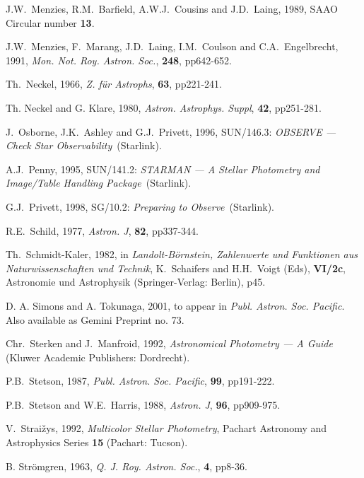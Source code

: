 \documentclass[twoside,11pt]{article}
\newcommand{\htmladdnormallink}[2]{#1}
\newcommand{\xref}[3]{#1}
\begin{document}
\begin{thebibliography}{99}
   J.W.~Menzies, R.M.~Barfield, A.W.J.~Cousins and
   J.D.~Laing, 1989, SAAO Circular number {\bf 13}.

   J.W.~Menzies, F.~Marang, J.D.~Laing, I.M.~Coulson
   and C.A.~Engelbrecht, 1991, {\it Mon. Not. Roy. Astron. Soc.},
   {\bf 248}, pp642-652.

   Th.~Neckel, 1966, {\it Z. f\"{u}r Astrophs}, {\bf
   63}, pp221-241.

   Th. Neckel and G. Klare, 1980, {\it Astron.
   Astrophys. Suppl}, {\bf 42}, pp251-281.

   J.~Osborne, J.K.~Ashley and G.J.~Privett, 1996,
   \xref{SUN/146.3}{sun146}{}: {\it OBSERVE --- Check Star Observability}\,
   (Starlink).

   A.J.~Penny, 1995, SUN/141.2: {\it STARMAN --- A
   Stellar Photometry and Image/Table Handling Package}\, (Starlink).

   G.J.~Privett, 1998, \xref{SG/10.2}{sg10}{}: {\it
   Preparing to Observe}\, (Starlink).

   R.E.~Schild, 1977, {\it Astron. J}, {\bf 82},
   pp337-344.

   Th.~Schmidt-Kaler, 1982, in {\it
   Landolt-B\"{o}rnstein, Zahlenwerte und Funktionen aus
   Naturwissenschaften und Technik}, K.~Schaifers and H.H.~Voigt (Eds),
   {\bf VI/2c}, Astronomie und Astrophysik (Springer-Verlag: Berlin), p45.

   D. A. Simons and A. Tokunaga, 2001, to appear in
   {\it Publ. Astron. Soc. Pacific}.  Also available as
   \htmladdnormallink{Gemini Preprint no. 73}
   {http://www.gemini.edu/documentation/preprints/pre73.html}.

   Chr.~Sterken and J.~Manfroid, 1992, {\it
   Astronomical Photometry --- A Guide}\, (Kluwer Academic Publishers:
   Dordrecht).

   P.B.~Stetson, 1987, {\it Publ. Astron.
   Soc. Pacific}, {\bf 99}, pp191-222.

   P.B.~Stetson and W.E.~Harris, 1988, {\it
   Astron. J}, {\bf 96}, pp909-975.

   V.~Strai\v{z}ys, 1992, {\it Multicolor
   Stellar Photometry}, Pachart Astronomy and Astrophysics Series {\bf 15}
   (Pachart: Tucson).

   B. Str\"{o}mgren, 1963, {\it Q. J. Roy. Astron.
   Soc.}, {\bf 4}, pp8-36.


\end{thebibliography}
\end{document}
